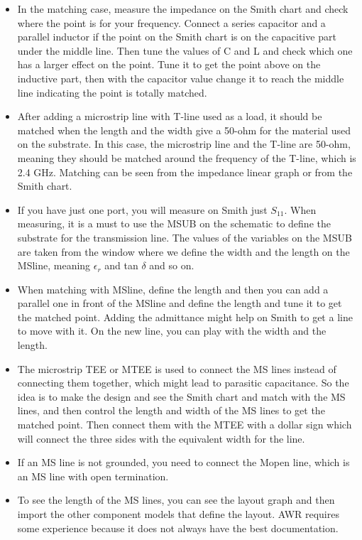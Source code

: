 \documentclass[english]{article}
\begin{document}
\begin{itemize}
    \item In the matching case, measure the impedance on the Smith chart and check where the point is for your frequency. Connect a series capacitor and a parallel inductor if the point on the Smith chart is on the capacitive part under the middle line. Then tune the values of C and L and check which one has a larger effect on the point. Tune it to get the point above on the inductive part, then with the capacitor value change it to reach the middle line indicating the point is totally matched.
    \item After adding a microstrip line with T-line used as a load, it should be matched when the length and the width give a 50-ohm for the material used on the substrate. In this case, the microstrip line and the T-line are 50-ohm, meaning they should be matched around the frequency of the T-line, which is 2.4 GHz. Matching can be seen from the impedance linear graph or from the Smith chart.
    \item If you have just one port, you will measure on Smith just \( S_{11} \). When measuring, it is a must to use the MSUB on the schematic to define the substrate for the transmission line. The values of the variables on the MSUB are taken from the window where we define the width and the length on the MSline, meaning \( \epsilon_r \) and tan \( \delta \) and so on.
    \item When matching with MSline, define the length and then you can add a parallel one in front of the MSline and define the length and tune it to get the matched point. Adding the admittance might help on Smith to get a line to move with it. On the new line, you can play with the width and the length.
    \item The microstrip TEE or MTEE is used to connect the MS lines instead of connecting them together, which might lead to parasitic capacitance. So the idea is to make the design and see the Smith chart and match with the MS lines, and then control the length and width of the MS lines to get the matched point. Then connect them with the MTEE with a dollar sign which will connect the three sides with the equivalent width for the line.
    \item If an MS line is not grounded, you need to connect the Mopen line, which is an MS line with open termination.
    \item To see the length of the MS lines, you can see the layout graph and then import the other component models that define the layout. AWR requires some experience because it does not always have the best documentation.
\end{itemize}
\end{document}
